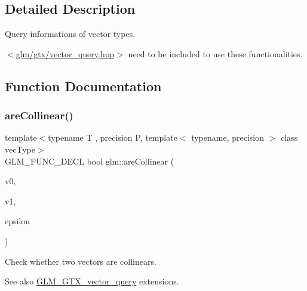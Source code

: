 \subsection{Detailed Description}
Query informations of vector types. 

$<$\hyperlink{vector__query_8hpp}{glm/gtx/vector\+\_\+query.\+hpp}$>$ need to be included to use these functionalities. 

\subsection{Function Documentation}
\mbox{\label{group__gtx__vector__query_ga465b844190d1740051e45d780832ea4c}} 
\subsubsection{\texorpdfstring{are\+Collinear()}{areCollinear()}}
{\footnotesize\ttfamily template$<$typename T , precision P, template$<$ typename, precision $>$ class vec\+Type$>$ \\
G\+L\+M\+\_\+\+F\+U\+N\+C\+\_\+\+D\+E\+CL bool glm\+::are\+Collinear (\begin{DoxyParamCaption}\item[{vec\+Type$<$ T, P $>$ const \&}]{v0,  }\item[{vec\+Type$<$ T, P $>$ const \&}]{v1,  }\item[{T const \&}]{epsilon }\end{DoxyParamCaption})}

Check whether two vectors are collinears. \begin{DoxySeeAlso}{See also}
\hyperlink{group__gtx__vector__query}{G\+L\+M\+\_\+\+G\+T\+X\+\_\+vector\+\_\+query} extensions. 
\end{DoxySeeAlso}
\mbox{\label{group__gtx__vector__query_gaee10acefed397c11e01f2862e837754c}} 

